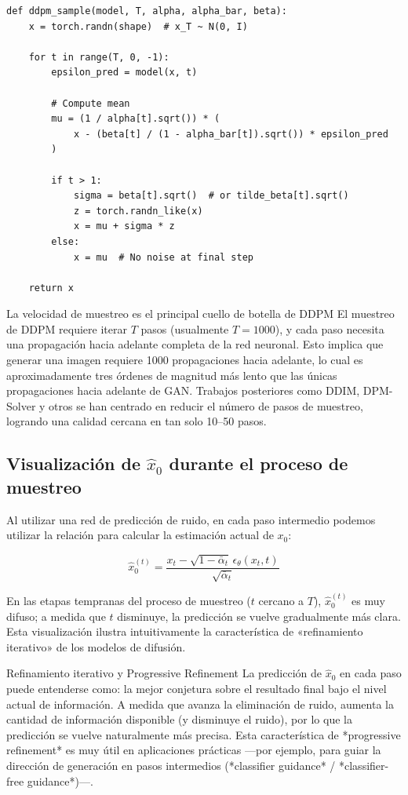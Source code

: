\documentclass[a4paper]{article}
\begin{document}
\begin{lstlisting}[caption={Algoritmo de muestreo DDPM}, label=lst:sample]
def ddpm_sample(model, T, alpha, alpha_bar, beta):
    x = torch.randn(shape)  # x_T ~ N(0, I)

    for t in range(T, 0, -1):
        epsilon_pred = model(x, t)

        # Compute mean
        mu = (1 / alpha[t].sqrt()) * (
            x - (beta[t] / (1 - alpha_bar[t]).sqrt()) * epsilon_pred
        )

        if t > 1:
            sigma = beta[t].sqrt()  # or tilde_beta[t].sqrt()
            z = torch.randn_like(x)
            x = mu + sigma * z
        else:
            x = mu  # No noise at final step

    return x
\end{lstlisting}

\begin{warningbox}{La velocidad de muestreo es el principal cuello de botella de DDPM}
El muestreo de DDPM requiere iterar $T$ pasos (usualmente $T = 1000$), y cada paso necesita una propagación hacia adelante completa de la red neuronal. Esto implica que generar una imagen requiere 1000 propagaciones hacia adelante, lo cual es aproximadamente tres órdenes de magnitud más lento que las únicas propagaciones hacia adelante de GAN. Trabajos posteriores como DDIM, DPM-Solver y otros se han centrado en reducir el número de pasos de muestreo, logrando una calidad cercana en tan solo 10--50 pasos.
\end{warningbox}

\subsection{Visualización de $\hat{x}_0$ durante el proceso de muestreo}

Al utilizar una red de predicción de ruido, en cada paso intermedio podemos utilizar la relación para calcular la estimación actual de $x_0$:

$$\hat{x}_0^{(t)} = \frac{x_t - \sqrt{1-\bar{\alpha}_t}\, \epsilon_\theta(x_t, t)}{\sqrt{\bar{\alpha}_t}}$$

En las etapas tempranas del proceso de muestreo ($t$ cercano a $T$), $\hat{x}_0^{(t)}$ es muy difuso; a medida que $t$ disminuye, la predicción se vuelve gradualmente más clara. Esta visualización ilustra intuitivamente la característica de «refinamiento iterativo» de los modelos de difusión.

\begin{knowledgebox}{Refinamiento iterativo y Progressive Refinement}
La predicción de $\hat{x}_0$ en cada paso puede entenderse como: la mejor conjetura sobre el resultado final bajo el nivel actual de información. A medida que avanza la eliminación de ruido, aumenta la cantidad de información disponible (y disminuye el ruido), por lo que la predicción se vuelve naturalmente más precisa. Esta característica de *progressive refinement* es muy útil en aplicaciones prácticas —por ejemplo, para guiar la dirección de generación en pasos intermedios (*classifier guidance* / *classifier-free guidance*)—.
\end{knowledgebox}
\end{document}
